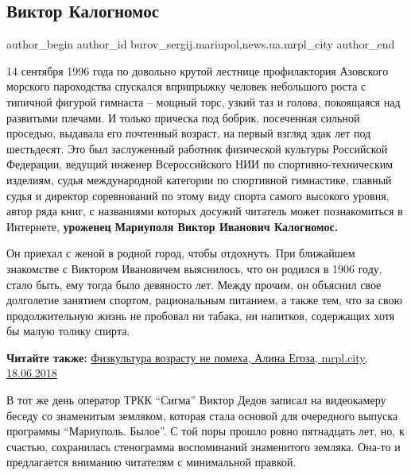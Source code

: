  
 
 
 
 
 
\subsection{Виктор Калогномос}
\label{sec:21_07_2018.stz.news.ua.mrpl_city.1.viktor_kalognomos}
 
\ifcmt
 author_begin
   author_id burov_sergij.mariupol,news.ua.mrpl_city
 author_end
\fi


14 сентября 1996 года по довольно крутой лестнице профилактория Азовского
морского пароходства спускался вприпрыжку человек небольшого роста с типичной
фигурой гимнаста – мощный торс, узкий таз и голова, покоящаяся над развитыми
плечами. И только прическа под бобрик, посеченная сильной проседью, выдавала
его почтенный возраст, на первый взгляд эдак лет под шестьдесят. Это был
заслуженный работник физической культуры Российской Федерации, ведущий инженер
Всероссийского НИИ по спортивно-техническим изделиям, судья международной
категории по спортивной гимнастике, главный судья и директор соревнований по
этому виду спорта самого высокого уровня, автор ряда книг, с названиями которых
досужий читатель может познакомиться в Интернете, \textbf{уроженец Мариуполя Виктор
Иванович Калогномос.}

Он приехал с женой в родной город, чтобы отдохнуть. При ближайшем знакомстве с
Виктором Ивановичем выяснилось, что он родился в 1906 году, стало быть, ему
тогда было девяносто лет. Между прочим, он объяснил свое долголетие занятием
спортом, рациональным питанием, а также тем, что за свою продолжительную жизнь
не пробовал ни табака, ни напитков, содержащих хотя бы малую толику спирта.

\textbf{Читайте также:} \href{https://mrpl.city/blogs/view/fizkultura-vozrastu-ne-pomeha}{Физкультура возрасту не помеха, Алина Егоза, mrpl.city, 18.06.2018}

В тот же день оператор ТРКК \enquote{Сигма} Виктор Дедов записал на видеокамеру беседу
со знаменитым земляком, которая стала основой для очередного выпуска программы
\enquote{Мариуполь. Былое}. С той поры прошло ровно пятнадцать лет, но, к счастью,
сохранилась стенограмма воспоминаний знаменитого земляка. Она-то и предлагается
вниманию читателям с минимальной правкой.

